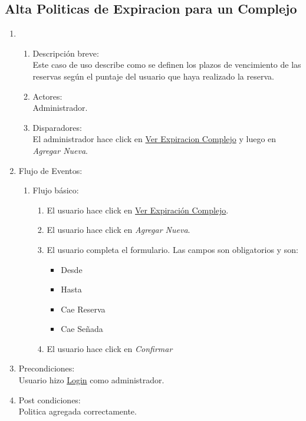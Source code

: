 \documentclass[a4paper,11pt]{article}
\begin{document}
\subsection{Alta Politicas de Expiracion para un Complejo} 
\begin{enumerate}
    \item
    \begin{enumerate}
    \item Descripci\'on breve: \\
        Este caso de uso describe como se definen los plazos de vencimiento de
        las reservas seg\'un el puntaje del usuario que haya realizado la reserva.
    \item Actores: \\
        Administrador.
    \item Disparadores: \\
        El administrador hace click en \underline{Ver Expiracion Complejo} y luego en \emph{Agregar Nueva}.
    \end{enumerate}
    \item Flujo de Eventos: 
    \begin{enumerate}
        \item Flujo b\'asico:
		\begin{enumerate}
            		\item El usuario hace click en \underline{Ver Expiraci\'on Complejo}.
            		\item El usuario hace click en \emph{Agregar Nueva}.
            		\item El usuario completa el formulario. Las campos son obligatorios y son:
            		\begin{itemize}
				\item Desde
				\item Hasta
				\item Cae Reserva
				\item Cae Se\~nada
			\end{itemize}
			\item El usuario hace click en \emph{Confirmar}
		\end{enumerate}
    \end{enumerate}
    \item Precondiciones: \\
        Usuario hizo \underline{Login} como administrador.
    \item Post condiciones: \\
        Politica agregada correctamente.
\end{enumerate}
\end{document}
